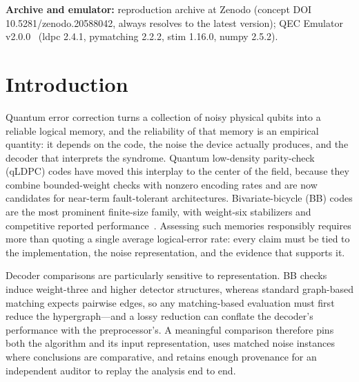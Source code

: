 \documentclass[pdflatex,sn-mathphys-num]{sn-jnl}
\theoremstyle{thmstyleone}
\theoremstyle{thmstyletwo}
\theoremstyle{thmstylethree}
\begin{document}
\maketitle
\noindent\textbf{Archive and emulator:} reproduction archive at Zenodo (concept DOI 10.5281/zenodo.20588042, always resolves to the latest version); QEC Emulator v2.0.0~\cite{AlDaajeh2026emulator} (ldpc 2.4.1, pymatching 2.2.2, stim 1.16.0, numpy 2.5.2).

\section{Introduction}

Quantum error correction turns a collection of noisy physical qubits into a reliable logical memory, and the reliability of that memory is an empirical quantity: it depends on the code, the noise the device actually produces, and the decoder that interprets the syndrome. Quantum low-density parity-check (qLDPC) codes have moved this interplay to the center of the field, because they combine bounded-weight checks with nonzero encoding rates and are now candidates for near-term fault-tolerant architectures. Bivariate-bicycle (BB) codes are the most prominent finite-size family, with weight-six stabilizers and competitive reported performance~\cite{Bravyi2024}. Assessing such memories responsibly requires more than quoting a single average logical-error rate: every claim must be tied to the implementation, the noise representation, and the evidence that supports it.

Decoder comparisons are particularly sensitive to representation. BB checks induce weight-three and higher detector structures, whereas standard graph-based matching expects pairwise edges, so any matching-based evaluation must first reduce the hypergraph---and a lossy reduction can conflate the decoder's performance with the preprocessor's. A meaningful comparison therefore pins both the algorithm and its input representation, uses matched noise instances where conclusions are comparative, and retains enough provenance for an independent auditor to replay the analysis end to end.
\end{document}
